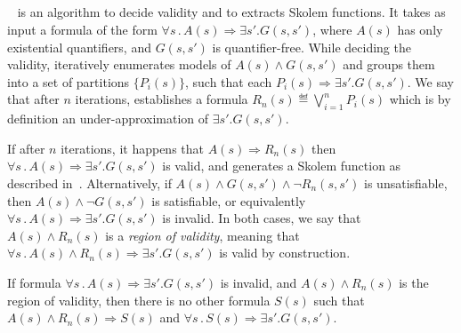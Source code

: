 \subsection{\aeval}
\label{sec:aeval}

\aeval~\cite{fedyukovich2015automated} is an algorithm to decide validity and to extracts Skolem functions.
It takes as input a formula of the form $\forall s \,.\,  A(s) \Rightarrow \exists s' . G(s,s')$, 
where $A(s)$ has only existential quantifiers, and $G(s,s')$ is quantifier-free.
%
While deciding the validity, \aeval iteratively enumerates models of $A(s) \land G (s, s')$ and groups them into a set of partitions $\{P_i(s)\}$, such that each $P_i(s) \Rightarrow \exists s' . G (s, s')$.
We say that after $n$ iterations, \aeval establishes a formula $R_n(s) \eqdef \bigvee_{i=1}^n P_i(s)$ which is by definition an under-approximation of $\exists s' . G (s, s')$.

If after $n$ iterations, it happens that $A(s) \Rightarrow R_n(s)$ then $\forall s \,.\,  A(s) \Rightarrow \exists s' . G(s,s')$ is valid, and \aeval generates a Skolem function as described in~\cite{katis2016synthesis}.
Alternatively, if $A(s) \land  G (s, s') \land \neg{R_n (s, s')}$ is unsatisfiable, then $A(s) \land \neg G (s, s')$ is satisfiable, or equivalently $\forall s \,.\,  A(s) \Rightarrow \exists s' . G(s,s')$ is invalid.
In both cases, we say that $A(s) \land R_n(s)$ is a \emph{region of validity}, meaning that $\forall s \,.\,  A(s) \land R_n(s) \Rightarrow \exists s' . G(s,s')$ is valid by construction.

\begin{lemma}
If formula $\forall s \,.\,  A(s) \Rightarrow \exists s' . G(s,s')$ is invalid, and $A(s) \land R_n(s)$ is the region of validity, then there is no other formula $S(s)$ such that $A(s) \land R_n(s) \Rightarrow S(s)$ and $\forall s \,.\,  S(s) \Rightarrow \exists s' . G(s,s')$.

\label{lem:subset}
\end{lemma}

